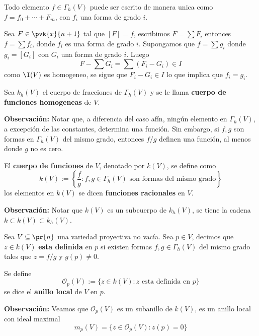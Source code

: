 \documentclass{article}
\begin{document}
\begin{prop}
    Todo elemento $f\in\Gamma_{h}(V)$ puede ser escrito de manera unica como 
    $f=f_{0}+\cdots+F_{m}$, con $f_{i}$ una forma de grado $i$.
\end{prop}
\begin{dem}
    Sea $F\in\pvk{x}{n+1}$ tal que $[F]=f$, escribimos $F=\sum F_{i}$ entonces $f=\sum f_{i}$, 
    donde $f_{i}$ es una forma de grado $i$. Supongamos que $f=\sum g_{i}$ donde $g_{i}=[G_{i}]$
    con $G_{i}$ una forma de grado $i$. Luego
    \begin{equation*}
        F-\sum G_{i}=\sum(F_{i}-G_{i})\in I
    \end{equation*}
    como $\I(V)$ es homogeneo, se sigue que $F_{i}-G_{i}\in I$ lo que implica que $f_{i}=g_{i}$.
\end{dem}
\begin{dfn}
    Sea $k_{h}(V)$ el cuerpo de fracciones de $\Gamma_{h}(V)$ y se le llama 
    \textbf{cuerpo de funciones homogeneas} de $V$.
\end{dfn}
\noindent\textbf{Observación:} Notar que, a diferencia del caso afín, ningún elemento en 
$\Gamma_{h}(V)$, a excepción de las constantes, determina una función. Sin embargo, si $f,g$ son 
formas en $\Gamma_{h}(V)$ del mismo grado, entonces $f/g$ definen una función, al menos donde
$g$ no es cero.
\begin{dfn}
    El \textbf{cuerpo de funciones} de $V$, denotado por $k(V)$, se define como
    \begin{equation*}
        k(V):=\left\{\frac{f}{g}:f,g\in\Gamma_{h}(V)\text{ son formas del mismo grado}\right\}
    \end{equation*}
    los elementos en $k(V)$ se dicen \textbf{funciones racionales} en $V$.
\end{dfn}
\noindent\textbf{Observación:} Notar que $k(V)$ es un subcuerpo de $k_{h}(V)$, se tiene la cadena
$k\subset k(V)\subset k_{h}(V)$.
\begin{dfn}
    Sea $V\subseteq\pr{n}$ una variedad proyectiva no vacía. Sea $p\in V$, decimos que $z\in k(V)$
    \textbf{esta definida} en $p$ si existen formas $f,g\in\Gamma_{h}(V)$ del mismo grado tales 
    que $z=f/g$ y $g(p)\neq0$.
\end{dfn}
\begin{dfn}
    Se define
    \begin{equation*}
        \mathcal{O}_{p}(V):=\{z\in k(V):z\text{ esta definida en }p\}
    \end{equation*}
    se dice el \textbf{anillo local} de $V$ en $p$.
\end{dfn}
\noindent\textbf{Observación:} Veamos que $\mathcal{O}_{p}(V)$ es un subanillo de $k(V)$, es un
anillo local con ideal maximal
\begin{equation*}
    m_{p}(V)=\{z\in\mathcal{O}_{p}(V):z(p)=0\}
\end{equation*}
\end{document}
